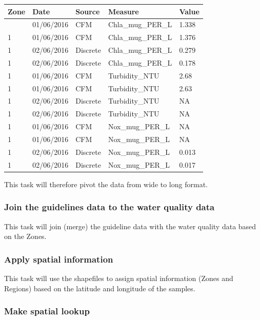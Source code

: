 \documentclass[
  8pt,
  a4paper]{article}
\begin{document}
\begin{longtable}[]{@{}lllll@{}}
\toprule\noalign{}
Zone & Date & Source & Measure & Value \\
\midrule\noalign{}
\endhead
\bottomrule\noalign{}
\endlastfoot
1 & 01/06/2016 & CFM & Chla\_mug\_PER\_L & 1.338 \\
1 & 01/06/2016 & CFM & Chla\_mug\_PER\_L & 1.376 \\
1 & 02/06/2016 & Discrete & Chla\_mug\_PER\_L & 0.279 \\
1 & 02/06/2016 & Discrete & Chla\_mug\_PER\_L & 0.178 \\
1 & 01/06/2016 & CFM & Turbidity\_NTU & 2.68 \\
1 & 01/06/2016 & CFM & Turbidity\_NTU & 2.63 \\
1 & 02/06/2016 & Discrete & Turbidity\_NTU & NA \\
1 & 02/06/2016 & Discrete & Turbidity\_NTU & NA \\
1 & 01/06/2016 & CFM & Nox\_mug\_PER\_L & NA \\
1 & 01/06/2016 & CFM & Nox\_mug\_PER\_L & NA \\
1 & 02/06/2016 & Discrete & Nox\_mug\_PER\_L & 0.013 \\
1 & 02/06/2016 & Discrete & Nox\_mug\_PER\_L & 0.017 \\
\end{longtable}

This task will therefore pivot the data from wide to long format.

\subsubsection{Join the guidelines data to the water quality
data}\label{join-the-guidelines-data-to-the-water-quality-data}

This task will join (merge) the guideline data with the water quality
data based on the Zones.

\subsubsection{Apply spatial
information}\label{apply-spatial-information}

This task will use the shapefiles to assign spatial information (Zones
and Regions) based on the latitude and longitude of the samples.

\subsubsection{Make spatial lookup}\label{make-spatial-lookup}
\end{document}
